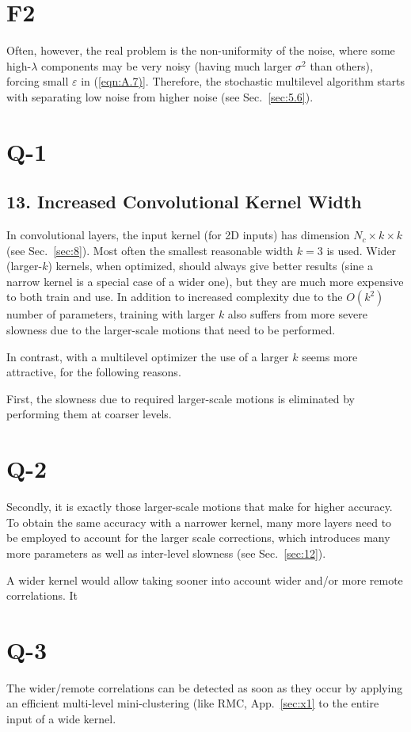 \documentclass{article} %
\begin{document}
\section{F2}
Often, however, the real problem is the non-uniformity of the noise, where some high-$\lambda$ components may be very noisy (having much larger $\sigma^2$ than others), forcing small $\varepsilon$ in (\ref{eqn:A.7)}. Therefore, the stochastic multilevel algorithm starts with separating low noise from higher noise (see Sec.~\ref{sec:5.6}).

\section{Q-1}
\subsection{13. Increased Convolutional Kernel Width}
In convolutional layers, the input kernel (for 2D inputs) has dimension $N_c \times k \times k$ (see Sec.~\ref{sec:8}). Most often the smallest reasonable width $k = 3$ is used. Wider (larger-$k$) kernels, when optimized, should always give better results (sine a narrow kernel is a special case of a wider one), but they are much more expensive to both train and use. In addition  to increased complexity due to the $O(k^2)$ number of parameters, training with larger $k$ also suffers from more severe slowness due to the larger-scale motions that need to be performed.

In contrast, with a multilevel optimizer the use of a larger $k$ seems more attractive, for the following reasons.

First, the slowness due to required larger-scale motions is eliminated by performing them at coarser levels.

\section{Q-2}
Secondly, it is exactly those larger-scale motions that make for higher accuracy. To obtain the same accuracy with a narrower kernel, many more layers need to be employed to account for the larger scale corrections, which introduces many more parameters as well as inter-level slowness (see Sec.~\ref{sec:12}).

A wider kernel would allow taking sooner into account wider and/or more remote correlations. It

\section{Q-3}
The wider/remote correlations can be detected as soon as they occur by applying an efficient multi-level mini-clustering (like RMC, App.~\ref{sec:x1} to the entire input of a wide kernel.
\end{document}
